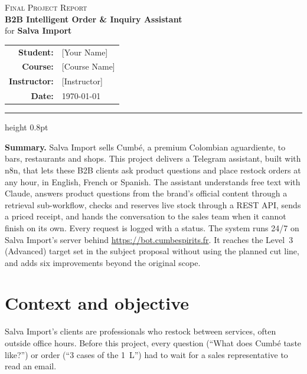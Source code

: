 \documentclass[11pt,a4paper]{article}
\newcommand{\studentname}{[Your Name]}
\newcommand{\coursename}{[Course Name]}
\newcommand{\instructor}{[Instructor]}
\newcommand{\submissiondate}{\today}
\begin{document}
\begin{center}
  {\small\scshape\color{salva!80} Final Project Report}\\[0.6em]
  {\LARGE\bfseries B2B Intelligent Order \& Inquiry Assistant}\\[0.3em]
  {\large for \textbf{Salva Import}}\\[1em]
  \begin{tabular}{@{}r@{\hspace{0.6em}}l@{}}
    \textbf{Student:}    & \studentname \\
    \textbf{Course:}     & \coursename \\
    \textbf{Instructor:} & \instructor \\
    \textbf{Date:}       & \submissiondate \\
  \end{tabular}
\end{center}

\vspace{0.4em}
{\color{salva}\hrule height 0.8pt}
\vspace{0.6em}

\textbf{Summary.} Salva Import sells Cumbé, a premium Colombian aguardiente, to bars,
restaurants and shops. This project delivers a Telegram assistant, built with n8n, that lets
these B2B clients ask product questions and place restock orders at any hour, in English, French
or Spanish. The assistant understands free text with Claude, answers product questions from the
brand's official content through a retrieval sub-workflow, checks and reserves live stock
through a REST API, sends a priced receipt, and hands the conversation to the sales team when
it cannot finish on its own. Every request is logged with a status. The system runs 24/7 on
Salva Import's server behind \url{https://bot.cumbespirits.fr}. It reaches the Level~3
(Advanced) target set in the subject proposal without using the planned cut line, and adds
six improvements beyond the original scope.

\section{Context and objective}
Salva Import's clients are professionals who restock between services, often outside office
hours. Before this project, every question (``What does Cumbé taste like?'') or order (``3 cases
of the 1~L'') had to wait for a sales representative to read an email.
\end{document}
